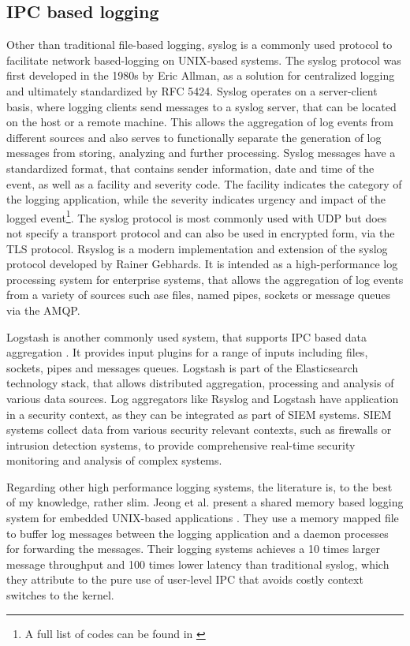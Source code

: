 \subsection{IPC based logging} \label{sec:ipc_logging}
Other than traditional file-based logging, syslog is a commonly used protocol to facilitate network based-logging
on UNIX-based systems. The syslog protocol was first developed in the 1980s by Eric Allman, as a solution
for centralized logging and ultimately standardized by RFC 5424\cite{gerhards2009}. Syslog operates on a server-client
basis, where logging clients send messages to a syslog server, that can be located on the host or a remote machine. This allows 
the aggregation of log events from different sources and also serves to functionally separate the generation of log messages from storing, analyzing
and further processing. 
Syslog messages have a standardized format, that contains sender information, date and time of the event, as well as a facility and severity code. The facility indicates
the category of the logging application, while the severity indicates urgency and impact of the logged event\footnote{A full list of codes can be found in \cite[p.10-11]{gerhards2009}}. 
The syslog protocol is most commonly used with \ac{UDP} but does not specify a transport protocol and can also be used in 
encrypted form, via the \ac{TLS} protocol. 
Rsyslog is a modern implementation and extension of the syslog protocol developed by Rainer Gebhards\cite{rsyslog}.
It is intended as a high-performance log processing system for enterprise systems, that allows the aggregation of log events
from a variety of sources such ase files, named pipes, sockets or message queues via the \ac{AMQP}\cite{vinoski2006advanced}. 
\par
Logstash is another commonly used system, that supports \ac{IPC} based data aggregation \cite{logstash}. It provides input 
plugins for a range of inputs including files, sockets, pipes and messages queues. Logstash is part of the Elasticsearch technology stack, that allows 
distributed aggregation, processing and analysis of various data sources. Log aggregators like Rsyslog and Logstash have application in a security context,
as they can be integrated as part of \ac{SIEM} systems. \ac{SIEM} systems collect data from various security relevant contexts, such as firewalls or intrusion detection 
systems, to provide comprehensive real-time security monitoring and analysis of complex systems\cite{bhatt2014operational}.
\par
Regarding other high performance logging systems, the literature is, to the best of my knowledge, rather slim.
Jeong et al. present a shared memory based logging system for embedded UNIX-based applications \cite{jeong2013high}.
They use a memory mapped file to buffer log messages between the logging application and a daemon processes for forwarding the messages.
Their logging systems achieves a 10 times larger message throughput and 100 times lower latency than traditional syslog, which they attribute 
to the pure use of user-level \ac{IPC} that avoids costly context switches to the kernel. 


